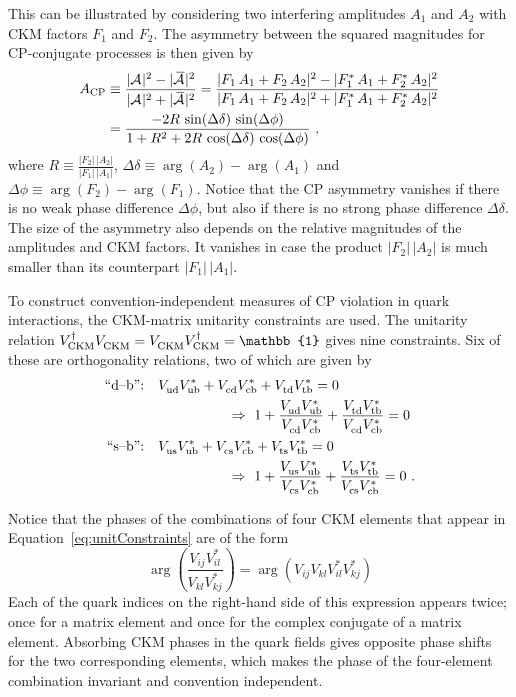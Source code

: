 This can be illustrated by considering two interfering amplitudes $A_1$ and $A_2$ with CKM factors $F_1$ and $F_2$. The asymmetry between
the squared magnitudes for CP-conjugate processes is then given by
\begin{equation}
  \label{eq:interference}
  \begin{split}
    A_\text{CP} &\equiv \frac{|\Af[]|^2 - |\Abarf[]|^2}{|\Af[]|^2 + |\Abarf[]|^2}
                 = \frac{|F_1\,A_1 + F_2\,A_2|^2 - |F_1^*\,A_1 + F_2^*\,A_2|^2}{|F_1\,A_1 + F_2\,A_2|^2 + |F_1^*\,A_1 + F_2^*\,A_2|^2} \\
                &= \frac{-2 R\, \sin(\Delta\delta)\, \sin(\Delta\phi)}{1 + R^2 + 2 R\, \cos(\Delta\delta)\, \cos(\Delta\phi)}
                   \ ,
  \end{split}
\end{equation}
where $R\equiv\frac{|F_2|\,|A_2|}{|F_1|\,|A_1|}$, $\Delta\delta\equiv\arg(A_2)-\arg(A_1)$ and $\Delta\phi\equiv\arg(F_2)-\arg(F_1)$. Notice
that the CP asymmetry vanishes if there is no weak phase difference $\Delta\phi$, but also if there is no strong phase difference
$\Delta\delta$. The size of the asymmetry also depends on the relative magnitudes of the amplitudes and CKM factors. It vanishes in case
the product $|F_2|\,|A_2|$ is much smaller than its counterpart $|F_1|\,|A_1|$.

To construct convention-independent measures of CP violation in quark interactions, the CKM-matrix unitarity constraints are used. The
unitarity relation $\VCKM[\dagger]\VCKM = \VCKM\VCKM[\dagger] = \mathbb{1}$ gives nine constraints. Six of these are orthogonality
relations, two of which are given by
\begin{subequations}
  \label{eq:unitConstraints}
  \begin{align}
    \text{``d--b'':} & \quad \Vud\Vub[*] + \Vcd\Vcb[*] + \Vtd\Vtb[*] = 0 \nonumber \\
    \label{eq:unitConstraints_d}
    &\qquad\qquad\qquad \Rightarrow\ 1 + \frac{\Vud\Vub[*]}{\Vcd\Vcb[*]} + \frac{\Vtd\Vtb[*]}{\Vcd\Vcb[*]} = 0 \\
    \text{``s--b'':} & \quad \Vus\Vub[*] + \Vcs\Vcb[*] + \Vts\Vtb[*] = 0 \nonumber \\
    \label{eq:unitConstraints_s}
    &\qquad\qquad\qquad \Rightarrow\ 1 + \frac{\Vus\Vub[*]}{\Vcs\Vcb[*]} + \frac{\Vts\Vtb[*]}{\Vcs\Vcb[*]} = 0 \ .
  \end{align}
\end{subequations}

Notice that the phases of the combinations of four CKM elements that appear in Equation~\ref{eq:unitConstraints} are of the form
\[
  \arg\left( \frac{V^{\phantom{*}}_{ij} V^{*}_{il}}{V^{\phantom{*}}_{kl} V^{*}_{kj}} \right)
    = \arg(V^{\phantom{*}}_{ij} V^{\phantom{*}}_{kl} V^{*}_{il} V^{*}_{kj})
\]
Each of the quark indices on the right-hand side of this expression appears twice; once for a matrix element and once for the complex
conjugate of a matrix element. Absorbing CKM phases in the quark fields gives opposite phase shifts for the two corresponding elements,
which makes the phase of the four-element combination invariant and convention independent.

